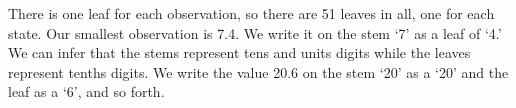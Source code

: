 \documentclass[11pt]{book}\usepackage[]{graphicx}\usepackage[]{color}
\begin{document}
There is one leaf for each observation, so there are 51 leaves in all, one for each state.  Our smallest observation is 7.4.  We write it on the stem `7' as a leaf of `4.'  We can infer that the stems represent tens and units digits while the leaves represent tenths digits.  We write the value 20.6 on the stem `20' as a `20' and the leaf as a `6', and so forth.  \citep{sullivan2013}

%
%
%
%
%
%
%
%
%
\end{document}
